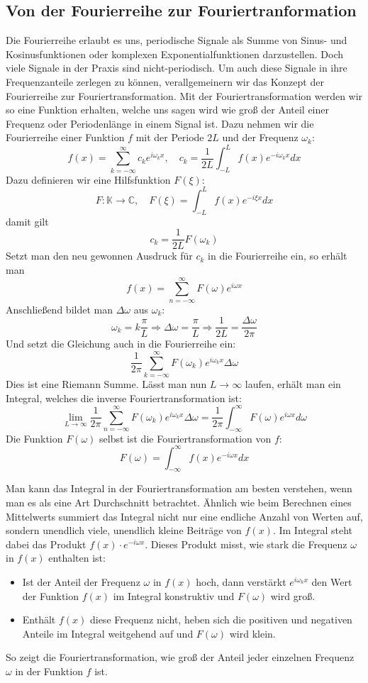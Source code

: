 \documentclass[a4paper,12pt]{article}
\theoremstyle{definition}
\theoremstyle{remark}
\begin{document}
\subsection{Von der Fourierreihe zur Fouriertranformation}
Die Fourierreihe erlaubt es uns, periodische Signale als Summe von Sinus- und Kosinusfunktionen oder komplexen Exponentialfunktionen darzustellen. Doch viele Signale in der Praxis sind nicht-periodisch. Um auch diese Signale in ihre Frequenzanteile zerlegen zu können, verallgemeinern wir das Konzept der Fourierreihe zur Fouriertransformation. Mit der Fouriertransformation werden wir so eine Funktion erhalten, welche uns sagen wird wie groß der Anteil einer Frequenz oder Periodenlänge in einem Signal ist. Dazu nehmen wir die Fourierreihe einer Funktion $f$ mit der Periode $2L$ und der Frequenz $\omega_k$: 
$$f(x) = \sum_{k = -\infty}^{\infty}{c_k e^{i\omega_k x} }, \quad c_k = \frac{1}{2L}\int_{-L}^L{f(x) e^{-i\omega_k x} dx}$$
Dazu definieren wir eine Hilfsfunktion $F(\xi)$: 
$$F:\mathbb{K} \to \mathbb{C}, \quad F(\xi) = \int_{-L}^{L}{f(x) e^{-i \xi x} dx}$$
damit gilt
$$ c_k = \frac{1}{2L} F(\omega_k)$$
Setzt man den neu gewonnen Ausdruck für $c_k$ in die Fourierreihe ein, so erhält man 
$$ f(x) = \sum_{n = -\infty}^{\infty}{F(\omega) e^{i\omega x}}$$
Anschließend bildet man $\Delta \omega$ aus $\omega_k$:
$$\omega_k = k \frac{\pi}{L} \Rightarrow \Delta \omega = \frac{\pi}{L} \Rightarrow \frac{1}{2L} = \frac{\Delta \omega} {2\pi}$$
Und setzt die Gleichung auch in die Fourierreihe ein: 
$$\frac{1}{2\pi} \sum_{k=-\infty}^{\infty}{F(\omega_k) e^{i \omega_k x} \Delta \omega}$$
Dies ist eine Riemann Summe. Lässt man nun $L \to \infty$ laufen, erhält man ein Integral, welches die inverse Fouriertransformation ist:
$$\lim_{L\to\infty} {\frac{1}{2\pi}\sum_{n = -\infty}^\infty{F(\omega_k) e^{i \omega_k x}\Delta \omega}} = \frac {1}{2\pi} \int_{-\infty}^{\infty}{F(\omega)e^{i \omega x} d\omega}$$
Die Funktion $F(\omega)$ selbst ist die Fouriertransformation von $f$:
$$F(\omega) = \int_{-\infty}^{\infty}{f(x) e^{-i\omega x} dx}$$

Man kann das Integral in der Fouriertransformation am besten verstehen, wenn man es 
als eine Art Durchschnitt betrachtet. Ähnlich wie beim Berechnen eines Mittelwerts 
summiert das Integral nicht nur eine endliche Anzahl von Werten auf, sondern unendlich viele, 
unendlich kleine Beiträge von $f(x)$. Im Integral steht dabei das Produkt $f(x) \cdot e^{-i\omega x}$.
Dieses Produkt misst, wie stark die Frequenz $\omega$ in $f(x)$ enthalten ist:
\begin{itemize}
    \item Ist der Anteil der Frequenz $\omega$ in $f(x)$ hoch, dann verstärkt $e^{i\omega_kx}$ den Wert der Funktion $f(x)$
    im Integral konstruktiv und $F(\omega)$ wird groß.
    \item Enthält $f(x)$ diese Frequenz nicht, heben sich die positiven und negativen Anteile 
    im Integral weitgehend auf und $F(\omega)$ wird klein.
\end{itemize}
So zeigt die Fouriertransformation, wie groß der Anteil jeder einzelnen Frequenz $\omega$ 
in der Funktion $f$ ist.
\end{document}

